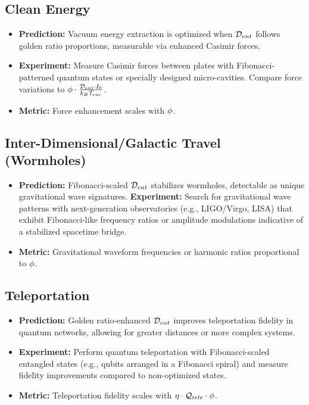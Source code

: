 \subsection{Clean Energy}
\begin{itemize}[noitemsep]
    \item \textbf{Prediction:} Vacuum energy extraction is optimized when $\mathcal{D}_{ent}$ follows golden ratio proportions, measurable via enhanced Casimir forces.
    \item \textbf{Experiment:} Measure Casimir forces between plates with Fibonacci-patterned quantum states or specially designed micro-cavities. Compare force variations to $\phi \cdot \frac{\mathcal{D}_{ent} \cdot I_0}{k_B \mathcal{T}_{vac}}$.
    \item \textbf{Metric:} Force enhancement scales with $\phi$.
\end{itemize}

\subsection{Inter-Dimensional/Galactic Travel (Wormholes)}
\begin{itemize}[noitemsep]
    \item \textbf{Prediction:} Fibonacci-scaled $\mathcal{D}_{ent}$ stabilizes wormholes, detectable as unique gravitational wave signatures.
    \textbf{Experiment:} Search for gravitational wave patterns with next-generation observatories (e.g., LIGO/Virgo, LISA) that exhibit Fibonacci-like frequency ratios or amplitude modulations indicative of a stabilized spacetime bridge.
    \item \textbf{Metric:} Gravitational waveform frequencies or harmonic ratios proportional to $\phi$.
\end{itemize}

\subsection{Teleportation}
\begin{itemize}[noitemsep]
    \item \textbf{Prediction:} Golden ratio-enhanced $\mathcal{D}_{ent}$ improves teleportation fidelity in quantum networks, allowing for greater distances or more complex systems.
    \item \textbf{Experiment:} Perform quantum teleportation with Fibonacci-scaled entangled states (e.g., qubits arranged in a Fibonacci spiral) and measure fidelity improvements compared to non-optimized states.
    \item \textbf{Metric:} Teleportation fidelity scales with $\eta \cdot \mathcal{Q}_{tele} \cdot \phi$.
\end{itemize}

